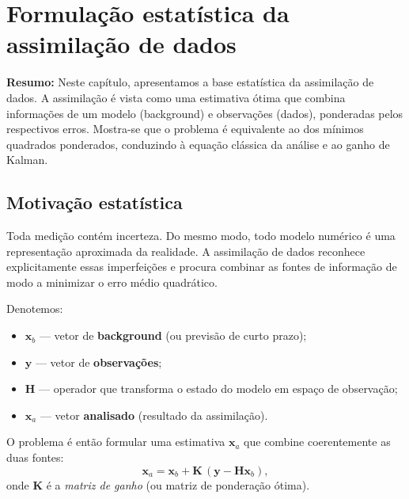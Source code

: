 \chapter{Formulação estatística da assimilação de dados}
\label{ch:formulacao-estatistica}

\noindent\textbf{Resumo:}
Neste capítulo, apresentamos a base estatística da assimilação de dados.  
A assimilação é vista como uma estimativa ótima que combina informações de um modelo (background) e observações (dados), ponderadas pelos respectivos erros.  
Mostra-se que o problema é equivalente ao dos mínimos quadrados ponderados, conduzindo à equação clássica da análise e ao ganho de Kalman.

\section{Motivação estatística}
Toda medição contém incerteza.  
Do mesmo modo, todo modelo numérico é uma representação aproximada da realidade.  
A assimilação de dados reconhece explicitamente essas imperfeições e procura combinar as fontes de informação de modo a minimizar o erro médio quadrático.

Denotemos:
\begin{itemize}
  \item $\mathbf{x}_b$ — vetor de \textbf{background} (ou previsão de curto prazo);
  \item $\mathbf{y}$ — vetor de \textbf{observações};
  \item $\mathbf{H}$ — operador que transforma o estado do modelo em espaço de observação;
  \item $\mathbf{x}_a$ — vetor \textbf{analisado} (resultado da assimilação).
\end{itemize}

O problema é então formular uma estimativa $\mathbf{x}_a$ que combine coerentemente as duas fontes:
\begin{equation}
\mathbf{x}_a = \mathbf{x}_b + \mathbf{K}\,(\mathbf{y} - \mathbf{H}\mathbf{x}_b),
\label{eq:analysis}
\end{equation}
onde $\mathbf{K}$ é a \emph{matriz de ganho} (ou matriz de ponderação ótima).

